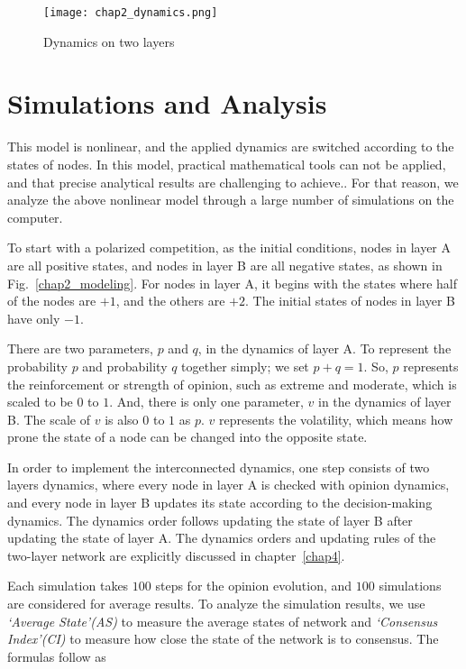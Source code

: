 \begin{figure}[!htb]
	\centering
	\texttt{[image: chap2\_dynamics.png]}
	\caption{Dynamics on two layers}
	\label{chap2_dynamics}
\end{figure}

\section{Simulations and Analysis}
This model is nonlinear, and the applied dynamics are switched according to the states of nodes. In this model, practical mathematical tools can not be applied, and that precise analytical results are challenging to achieve.\parencite{nicolas2017, rainer2002}. For that reason, we analyze the above nonlinear model through a large number of simulations on the computer.

To start with a polarized competition, as the initial conditions,  nodes in layer A are all positive states, and nodes in layer B are all negative states, as shown in Fig.~\ref{chap2_modeling}. For nodes in layer A, it begins with the states where half of the nodes are $+1$, and the others are $+2$. The initial states of nodes in layer B have only $-1$.

There are two parameters, $p$ and $q$, in the dynamics of layer A. To represent the probability $p$ and probability $q$ together simply; we set $p+q=1$. So, $p$ represents the reinforcement or strength of opinion, such as extreme and moderate, which is scaled to be $0$ to $1$. And, there is only one parameter, $v$ in the dynamics of layer B. The scale of $v$ is also $0$ to $1$ as $p$. $v$ represents the volatility, which means how prone the state of a node can be changed into the opposite state.

In order to implement the interconnected dynamics, one step consists of two layers dynamics, where every node in layer A is checked with opinion dynamics, and every node in layer B updates its state according to the decision-making dynamics. The dynamics order follows updating the state of layer B after updating the state of layer A. The dynamics orders and updating rules of the two-layer network are explicitly discussed in chapter~\ref{chap4}.     

Each simulation takes $100$ steps for the opinion evolution, and $100$ simulations are considered for average results. To analyze the simulation results, we use \textit{`Average State'(AS)} to measure the average states of network and \textit{`Consensus Index'(CI)} to measure how close the state of the network is to consensus. The formulas follow as

